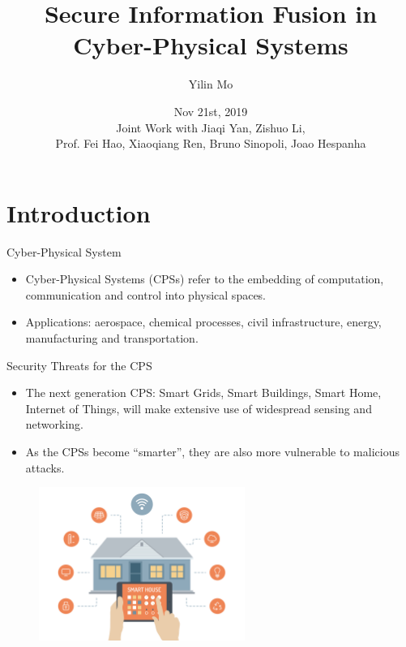 \documentclass[10pt]{beamer}
\title[Secure Info Fusion]{Secure Information Fusion in Cyber-Physical Systems}
\author[Yilin Mo]{Yilin Mo}
\institute[Tsinghua]{
  Department of Automation\\ Tsinghua University\\
}
\date[Nov 21, 2019]{Nov 21st, 2019 \\ 
  \small Joint Work with Jiaqi Yan, Zishuo Li,\\
  Prof. Fei Hao, Xiaoqiang Ren, Bruno Sinopoli, Joao Hespanha}
\begin{document}
\maketitle 

\section{Introduction}

\begin{frame}{Cyber-Physical System}
  \begin{itemize}
  \item Cyber-Physical Systems (CPSs) refer to the embedding of computation, communication and control into physical spaces.
    \begin{center}
    \end{center}
  \item Applications: aerospace, chemical processes, civil infrastructure, energy, manufacturing and transportation. 
  \end{itemize}
\end{frame}

\begin{frame}{Security Threats for the CPS}
  \begin{itemize}
  \item The next generation CPS: Smart Grids, Smart Buildings, Smart Home, Internet of Things, will make extensive use of widespread sensing and networking.
  \item As the CPSs become ``smarter'', they are also more vulnerable to malicious attacks.
  \end{itemize}
  \begin{figure}[ht]
    \centering
    \includegraphics[width=0.6\textwidth]{SmartHome.jpg}
  \end{figure}
\end{frame}
\end{document}
